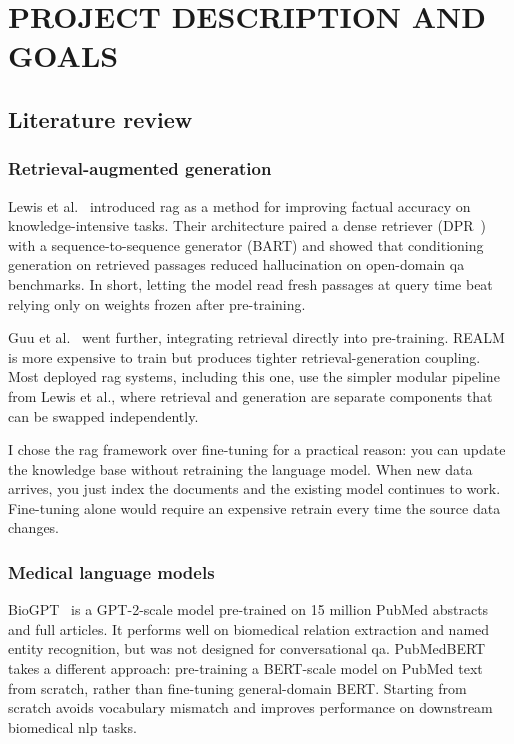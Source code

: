 \chapter{\MakeUppercase{Project Description and Goals}}

\section{Literature review}

\subsection{Retrieval-augmented generation}

Lewis et al.~\cite{lewis2020rag} introduced \ac{rag} as a method for improving factual accuracy on knowledge-intensive tasks. Their architecture paired a dense retriever (DPR~\cite{karpukhin2020dpr}) with a sequence-to-sequence generator (BART) and showed that conditioning generation on retrieved passages reduced hallucination on open-domain \ac{qa} benchmarks. In short, letting the model read fresh passages at query time beat relying only on weights frozen after pre-training.

Guu et al.~\cite{guu2020realm} went further, integrating retrieval directly into pre-training. REALM is more expensive to train but produces tighter retrieval-generation coupling. Most deployed \ac{rag} systems, including this one, use the simpler modular pipeline from Lewis et al., where retrieval and generation are separate components that can be swapped independently.

I chose the \ac{rag} framework over fine-tuning for a practical reason: you can update the knowledge base without retraining the language model. When new data arrives, you just index the documents and the existing model continues to work. Fine-tuning alone would require an expensive retrain every time the source data changes.

\subsection{Medical language models}

BioGPT~\cite{luo2022biogpt} is a GPT-2-scale model pre-trained on 15 million PubMed abstracts and full articles. It performs well on biomedical relation extraction and named entity recognition, but was not designed for conversational \ac{qa}. PubMedBERT~\cite{gu2021pubmedbert} takes a different approach: pre-training a BERT-scale model on PubMed text from scratch, rather than fine-tuning general-domain BERT. Starting from scratch avoids vocabulary mismatch and improves performance on downstream biomedical \ac{nlp} tasks.

